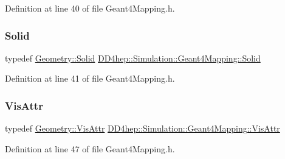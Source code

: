 Definition at line 40 of file Geant4\+Mapping.\+h.

\hypertarget{class_d_d4hep_1_1_simulation_1_1_geant4_mapping_ac94b8af2661de6ba577901ae8cdea3f9}{}\label{class_d_d4hep_1_1_simulation_1_1_geant4_mapping_ac94b8af2661de6ba577901ae8cdea3f9} 
\subsubsection{\texorpdfstring{Solid}{Solid}}
{\footnotesize\ttfamily typedef \hyperlink{namespace_d_d4hep_1_1_geometry_a83de90a8dcc7378ba47d54ef9a6a687b}{Geometry\+::\+Solid} \hyperlink{class_d_d4hep_1_1_simulation_1_1_geant4_mapping_ac94b8af2661de6ba577901ae8cdea3f9}{D\+D4hep\+::\+Simulation\+::\+Geant4\+Mapping\+::\+Solid}}



Definition at line 41 of file Geant4\+Mapping.\+h.

\hypertarget{class_d_d4hep_1_1_simulation_1_1_geant4_mapping_aea00056d988cf94eb39b25514928e3a6}{}\label{class_d_d4hep_1_1_simulation_1_1_geant4_mapping_aea00056d988cf94eb39b25514928e3a6} 
\subsubsection{\texorpdfstring{Vis\+Attr}{VisAttr}}
{\footnotesize\ttfamily typedef \hyperlink{class_d_d4hep_1_1_geometry_1_1_vis_attr}{Geometry\+::\+Vis\+Attr} \hyperlink{class_d_d4hep_1_1_simulation_1_1_geant4_mapping_aea00056d988cf94eb39b25514928e3a6}{D\+D4hep\+::\+Simulation\+::\+Geant4\+Mapping\+::\+Vis\+Attr}}



Definition at line 47 of file Geant4\+Mapping.\+h.

\hypertarget{class_d_d4hep_1_1_simulation_1_1_geant4_mapping_a86c52918ea76c0cbd7a4bffb971f33a5}{}\label{class_d_d4hep_1_1_simulation_1_1_geant4_mapping_a86c52918ea76c0cbd7a4bffb971f33a5} 
